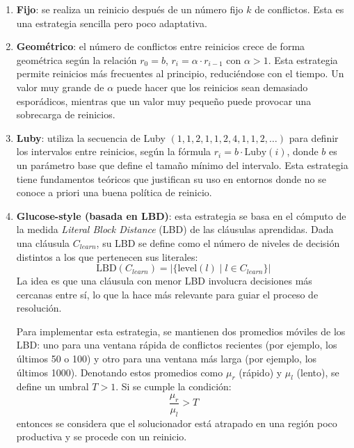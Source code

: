 \begin{enumerate}
    \item \textbf{Fijo}: se realiza un reinicio después de un número fijo $k$ de conflictos. Esta es una estrategia sencilla pero poco adaptativa.

    \item \textbf{Geométrico}: el número de conflictos entre reinicios crece de forma geométrica según la relación $r_0 = b$, $r_i = \alpha \cdot r_{i-1}$ con $\alpha > 1$. Esta estrategia permite reinicios más frecuentes al principio, reduciéndose con el tiempo. Un valor muy grande de $\alpha$ puede hacer que los reinicios sean demasiado esporádicos, mientras que un valor muy pequeño puede provocar una sobrecarga de reinicios.

    \item \textbf{Luby}: utiliza la secuencia de Luby $(1,1,2,1,1,2,4,1,1,2,\dots)$ para definir los intervalos entre reinicios, según la fórmula $r_i = b \cdot \text{Luby}(i)$, donde $b$ es un parámetro base que define el tamaño mínimo del intervalo. Esta estrategia tiene fundamentos teóricos que justifican su uso en entornos donde no se conoce a priori una buena política de reinicio.

    \item \textbf{Glucose-style (basada en LBD)}: esta estrategia se basa en el cómputo de la medida \textit{Literal Block Distance} (LBD) de las cláusulas aprendidas. Dada una cláusula $C_{learn}$, su LBD se define como el número de niveles de decisión distintos a los que pertenecen sus literales:
    \begin{equation*}
        \text{LBD}(C_{learn}) = |\{ \text{level}(l)\mid l \in C_{learn} \}|
    \end{equation*}
    La idea es que una cláusula con menor LBD involucra decisiones más cercanas entre sí, lo que la hace más relevante para guiar el proceso de resolución. 

    Para implementar esta estrategia, se mantienen dos promedios móviles de los LBD: uno para una ventana rápida de conflictos recientes (por ejemplo, los últimos 50 o 100) y otro para una ventana más larga (por ejemplo, los últimos 1000). Denotando estos promedios como $\mu_r$ (rápido) y $\mu_l$ (lento), se define un umbral $T > 1$. Si se cumple la condición:
    \begin{equation*}
        \frac{\mu_r}{\mu_l} > T
    \end{equation*}
    entonces se considera que el solucionador está atrapado en una región poco productiva y se procede con un reinicio.
\end{enumerate}

